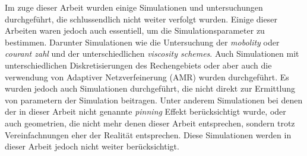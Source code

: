 Im zuge dieser Arbeit wurden einige Simulationen und untersuchungen durchgeführt, die schlussendlich nicht weiter verfolgt wurden. Einige dieser Arbeiten waren jedoch auch essentiell, um die Simulationsparameter zu bestimmen. Darunter Simulationen wie die Untersuchung der \textit{mobolity} oder \textit{courant zahl} und der unterschiedlichen \textit{viscosity schemes}. Auch Simulationen mit unterschiedlichen Diskretisierungen des Rechengebiets oder aber auch die verwendung von Adaptiver Netzverfeinerung (AMR) wurden durchgeführt. Es wurden jedoch auch Simulationen durchgeführt, die nicht direkt zur Ermittlung von parametern der Simulation beitragen. Unter anderem Simulationen bei denen der in dieser Arbeit nicht genannte \textit{pinning} Effekt berücksichtigt wurde, oder auch geometrien, die nicht mehr denen dieser Arbeit entsprechen, sondern trotz Vereinfachnungen eher der Realität entsprechen. Diese Simulationen werden in dieser Arbeit jedoch nicht weiter berücksichtigt.  
